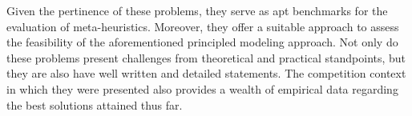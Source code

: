Given the pertinence of these problems, they serve as apt benchmarks for the
evaluation of meta-heuristics. Moreover, they offer a suitable approach to
assess the feasibility of the aforementioned principled modeling approach. Not
only do these problems present challenges from theoretical and practical
standpoints, but they are also have well written and detailed statements. The
competition context in which they were presented also provides a wealth of
empirical data regarding the best solutions attained thus far.